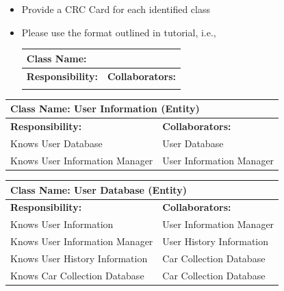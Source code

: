 \documentclass[]{article}
\begin{document}
\begin{itemize}
	\item Provide a CRC Card for each identified class
	\item Please use the format outlined in tutorial, i.e., 
	\begin{table}[ht]
		\centering
		\begin{tabular}{|p{5cm}|p{5cm}|}
		\hline 
		 \multicolumn{2}{|l|}{\textbf{Class Name:}} \\
		\hline
		\textbf{Responsibility:} & \textbf{Collaborators:} \\
		\hline
		\vspace{1in} & \\
		\hline
		\end{tabular}
	\end{table}
	
\end{itemize}

\begin{table}[ht]
    \centering
    \begin{tabular}{|p{5cm}|p{5cm}|}
        \hline
        \multicolumn{2}{|l|}{\textbf{Class Name: User Information (Entity)}} \\
        \hline
        \textbf{Responsibility:} & \textbf{Collaborators:} \\
        \hline
        Knows User Database & User Database \\
        Knows User Information Manager & User Information Manager \\
        \hline
    \end{tabular}
\end{table}

\begin{table}[ht]
    \centering
    \begin{tabular}{|p{5cm}|p{5cm}|}
        \hline
        \multicolumn{2}{|l|}{\textbf{Class Name: User Database (Entity)}} \\
        \hline
        \textbf{Responsibility:} & \textbf{Collaborators:} \\
        \hline
        Knows User Information & User Information Manager \\
        Knows User Information Manager & User History Information \\
        Knows User History Information & Car Collection Database \\
        Knows Car Collection Database & Car Collection Database \\
        \hline
    \end{tabular}
\end{table}
\end{document}
